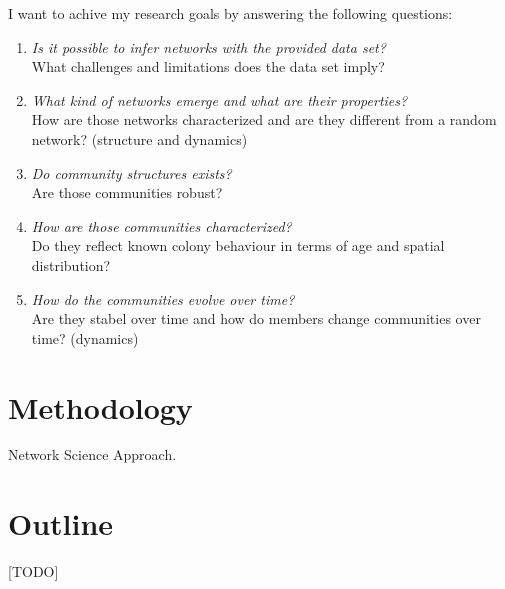 I want to achive my research goals by answering the following questions:

\begin{enumerate}
\item \emph{Is it possible to infer networks with the provided data set?}\\
What challenges and limitations does the data set imply?
\item \emph{What kind of networks emerge and what are their properties?}\\
How are those networks characterized and are they different from a random network? (structure and dynamics)
\item \emph{Do community structures exists?}\\
Are those communities robust?
\item \emph{How are those communities characterized?}\\
Do they reflect known colony behaviour in terms of age and spatial distribution?
\item \emph{How do the communities evolve over time?}\\
Are they stabel over time and how do members change communities over time? (dynamics)

\end{enumerate}


\section{Methodology}

Network Science Approach.

\section{Outline}
[TODO]